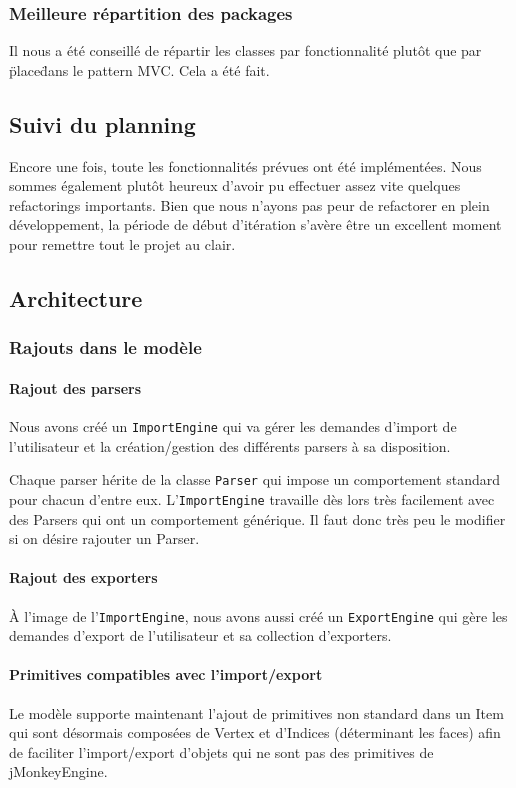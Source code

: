 	\subsubsection{Meilleure répartition des packages}
	Il nous a été conseillé de répartir les classes par fonctionnalité plutôt
	que par \"place\" dans le pattern MVC. Cela a été fait.


\subsection{Suivi du planning}
Encore une fois, toute les fonctionnalités prévues ont été implémentées. Nous 
sommes également plutôt heureux d'avoir pu effectuer assez vite quelques 
refactorings importants. Bien que nous n'ayons pas peur de refactorer en plein 
développement, la période de début d'itération s'avère être un excellent moment 
pour remettre tout le projet au clair.


\subsection{Architecture}
	
	\subsubsection{Rajouts dans le modèle}

		\paragraph{Rajout des parsers}
		Nous avons créé un \texttt{ImportEngine} qui va gérer les demandes 
		d'import de l'utilisateur et la création/gestion des différents parsers 
		à sa disposition. 

		Chaque parser hérite de la classe \texttt{Parser} qui impose un comportement
		standard pour chacun d'entre eux. L'\texttt{ImportEngine} travaille dès
		lors très facilement avec des Parsers qui ont un comportement générique.
		Il faut donc très peu le modifier si on désire rajouter un Parser.

		\paragraph{Rajout des exporters}
		À l'image de l'\texttt{ImportEngine}, nous avons aussi créé un 
		\texttt{ExportEngine} qui gère les demandes d'export de l'utilisateur et
		sa collection d'exporters.

		\paragraph{Primitives compatibles avec l'import/export}
		Le modèle supporte maintenant l'ajout de primitives non standard dans un
		Item qui sont désormais composées de Vertex et d'Indices (déterminant 
		les faces) afin de faciliter l'import/export d'objets qui ne sont pas des
		primitives de jMonkeyEngine.

